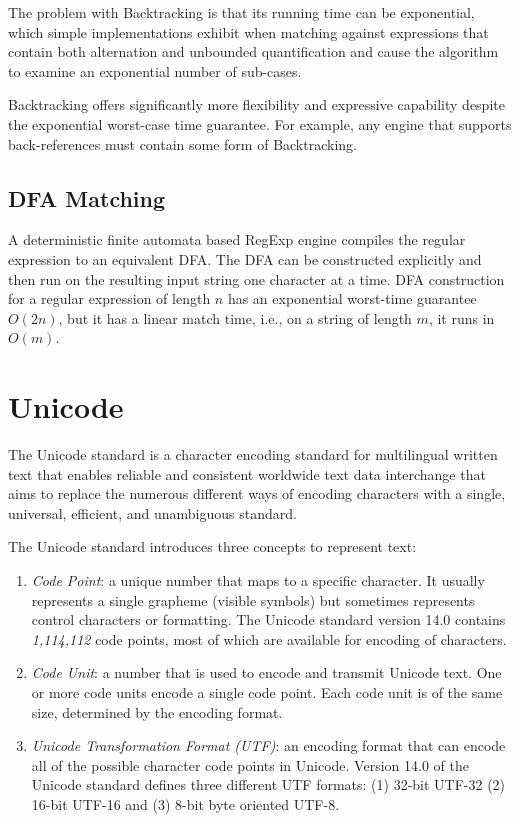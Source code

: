 The problem with Backtracking is that its running time can be exponential, which simple implementations exhibit when matching against expressions that contain both alternation and unbounded quantification and cause the algorithm to examine an exponential number of sub-cases.

Backtracking offers significantly more flexibility and expressive capability despite the exponential worst-case time guarantee. For example, any engine that supports back-references must contain some form of Backtracking.

\subsection{DFA Matching}

A deterministic finite automata based RegExp engine compiles the regular expression to an equivalent DFA. The DFA can be constructed explicitly and then run on the resulting input string one character at a time. DFA construction for a regular expression of length $n$ has an exponential worst-time guarantee $O(2{n})$, but it has a linear match time, i.e., on a string of length $m$, it runs in $O(m)$.

\section{Unicode}
The Unicode standard \cite{unicode} is a character encoding standard for multilingual written text that enables reliable and consistent worldwide text data interchange that aims to replace the numerous different ways of encoding characters with a single, universal, efficient, and unambiguous standard.

The Unicode standard introduces three concepts to represent text:
\begin{enumerate}
    \item \textit{Code Point}: a unique number that maps to a specific character. It usually represents a single grapheme (visible symbols) but sometimes represents control characters or formatting. The Unicode standard version 14.0 contains \textit{1,114,112} code points, most of which are available for encoding of characters.
    
    \item \textit{Code Unit}: a number that is used to encode and transmit Unicode text. One or more code units encode a single code point. Each code unit is of the same size, determined by the encoding format.
    
    \item \textit{Unicode Transformation Format (UTF)}: an encoding format that can encode all of the possible character code points in Unicode. Version 14.0 of the Unicode standard defines three different UTF formats: (1) 32-bit UTF-32 (2) 16-bit UTF-16 and (3) 8-bit byte oriented UTF-8.
\end{enumerate}

